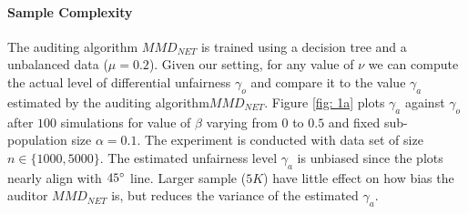 \documentclass{article}
\begin{document}
\bigskip
\paragraph{Sample Complexity}
The auditing algorithm $MMD_{NET}$ is trained using a decision tree and a unbalanced data ($\mu=0.2$). Given our setting, for any value of $\nu$ we can compute the actual level of differential unfairness $\gamma_{o}$ and compare it to the value  $\gamma_{a}$ estimated by the auditing algorithm$MMD_{NET}$.  Figure \ref{fig: 1a} plots $\gamma_{a}$ against $\gamma_{o}$ after $100$ simulations for value of $\beta$ varying from $0$ to $0.5$ and fixed sub-population size $\alpha=0.1$. The experiment is conducted with data set of size $n\in \{1000, 5000\}$. The estimated unfairness level $\gamma_{a}$ is unbiased since the plots nearly align with $45\degree$ line. Larger sample ($5K$) have little effect on how bias the auditor $MMD_{NET}$ is, but reduces the variance of the estimated $\gamma_{a}$.  
\end{document}
